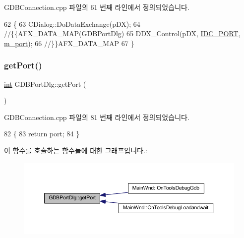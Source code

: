 G\+D\+B\+Connection.\+cpp 파일의 61 번째 라인에서 정의되었습니다.


\begin{DoxyCode}
62 \{
63   CDialog::DoDataExchange(pDX);
64   \textcolor{comment}{//\{\{AFX\_DATA\_MAP(GDBPortDlg)}
65   DDX\_Control(pDX, \mbox{\hyperlink{resource_8h_a574f1300495ff98df6df2d9fa6aee8c3}{IDC\_PORT}}, \mbox{\hyperlink{class_g_d_b_port_dlg_a243e7307371feed3fe058cbf822c3cb0}{m\_port}});
66   \textcolor{comment}{//\}\}AFX\_DATA\_MAP}
67 \}
\end{DoxyCode}
\mbox{\label{class_g_d_b_port_dlg_aedb1de0b6ce4cf403b6be05f2a6d9668}} 
\subsubsection{\texorpdfstring{get\+Port()}{getPort()}}
{\footnotesize\ttfamily \mbox{\hyperlink{_util_8cpp_a0ef32aa8672df19503a49fab2d0c8071}{int}} G\+D\+B\+Port\+Dlg\+::get\+Port (\begin{DoxyParamCaption}{ }\end{DoxyParamCaption})}



G\+D\+B\+Connection.\+cpp 파일의 81 번째 라인에서 정의되었습니다.


\begin{DoxyCode}
82 \{
83   \textcolor{keywordflow}{return} port;
84 \}
\end{DoxyCode}
이 함수를 호출하는 함수들에 대한 그래프입니다.\+:
\nopagebreak
\begin{figure}[H]
\begin{center}
\leavevmode
\includegraphics[width=350pt]{class_g_d_b_port_dlg_aedb1de0b6ce4cf403b6be05f2a6d9668_icgraph}
\end{center}
\end{figure}
\mbox{\label{class_g_d_b_port_dlg_a6319081133e78827d9dfb6c287d88068}} 
